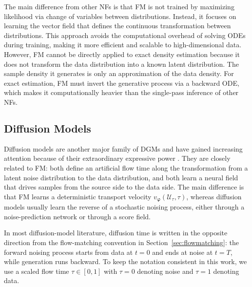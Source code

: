 The main difference from other \acp{NF} is that \ac{FM} is not trained by maximizing likelihood via change of variables between distributions. Instead, it focuses on learning the vector field that defines the continuous transformation between distributions. This approach avoids the computational overhead of solving \acp{ODE} during training, making it more efficient and scalable to high-dimensional data. However, \ac{FM} cannot be directly applied to exact density estimation because it does not transform the data distribution into a known latent distribution. The sample density it generates is only an approximation of the data density. For exact estimation, \ac{FM} must invert the generative process via a backward \ac{ODE}, which makes it computationally heavier than the single-pass inference of other \acp{NF}.

\subsection{Diffusion Models}
\label{sec:diffusionmodels}
Diffusion models are another major family of \acp{DGM} and have gained increasing attention because of their extraordinary expressive power \citep{sohl2015deep,ho2020ddpm,song2021scorebased}. They are closely related to \ac{FM}: both define an artificial flow time along the transformation from a latent noise distribution to the data distribution, and both learn a neural field that drives samples from the source side to the data side. The main difference is that \ac{FM} learns a deterministic transport velocity $v_{\boldsymbol{\varphi}}(\mathcal{U}_\tau,\tau)$, whereas diffusion models usually learn the reverse of a stochastic noising process, either through a noise-prediction network or through a score field.

In most diffusion-model literature, diffusion time is written in the opposite direction from the flow-matching convention in Section~\ref{sec:flowmatching}: the forward noising process starts from data at $t=0$ and ends at noise at $t=T$, while generation runs backward. To keep the notation consistent in this work, we use a scaled flow time $\tau\in[0,1]$ with $\tau=0$ denoting noise and $\tau=1$ denoting data.

